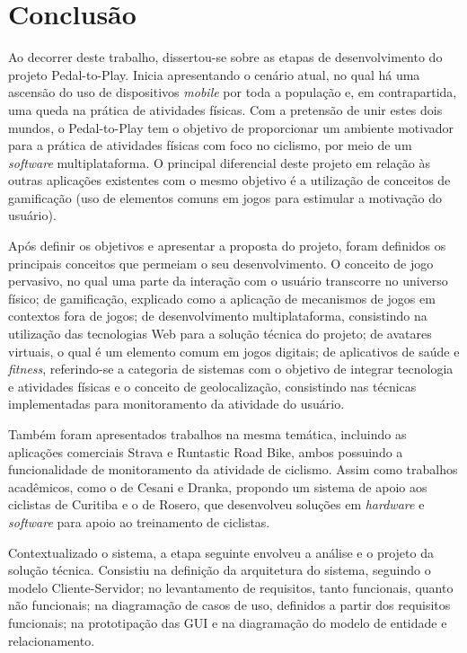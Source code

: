 \chapter{Conclusão} \label{cap:conclusao}
Ao decorrer deste trabalho, dissertou-se sobre as etapas de desenvolvimento do projeto Pedal-to-Play. Inicia apresentando o cenário atual, no qual há uma ascensão do uso de dispositivos \textit{mobile} por toda a população e, em contrapartida, uma queda na prática de atividades físicas. Com a pretensão de unir estes dois mundos, o Pedal-to-Play tem o objetivo de proporcionar um ambiente motivador para a prática de atividades físicas com foco no ciclismo, por meio de um \textit{software} multiplataforma. O principal diferencial deste projeto em relação às outras aplicações existentes com o mesmo objetivo é a utilização de conceitos de gamificação (uso de elementos comuns em jogos para estimular a motivação do usuário). 
\par
Após definir os objetivos e apresentar a proposta do projeto, foram definidos os principais conceitos que permeiam o seu desenvolvimento. O conceito de jogo pervasivo, no qual uma parte da interação com o usuário transcorre no universo físico; de gamificação, explicado como a aplicação de mecanismos de jogos em contextos fora de jogos; de desenvolvimento multiplataforma, consistindo na utilização das tecnologias Web para a solução técnica do projeto; de avatares virtuais, o qual é um elemento comum em jogos digitais; de aplicativos de saúde e \textit{fitness}, referindo-se a categoria de sistemas com o objetivo de integrar tecnologia e atividades físicas e o conceito de geolocalização, consistindo nas técnicas implementadas para monitoramento da atividade do usuário.
\par
Também foram apresentados trabalhos na mesma temática, incluindo as aplicações comerciais Strava e Runtastic Road Bike, ambos possuindo a funcionalidade de monitoramento da atividade de ciclismo. Assim como trabalhos acadêmicos, como o de Cesani e Dranka, propondo um sistema de apoio aos ciclistas de Curitiba e o de Rosero, que desenvolveu soluções em \textit{hardware} e \textit{software} para apoio ao treinamento de ciclistas.
\par 
Contextualizado o sistema, a etapa seguinte envolveu a análise e o projeto da solução técnica. Consistiu na definição da arquitetura do sistema, seguindo o modelo Cliente-Servidor; no levantamento de requisitos, tanto funcionais, quanto não funcionais; na diagramação de casos de uso, definidos a partir dos requisitos funcionais; na prototipação das GUI e na diagramação do modelo de entidade e relacionamento. 
